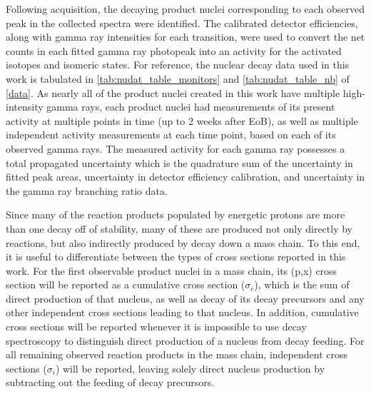 \documentclass[3p]{elsarticle}
\begin{document}
Following  acquisition, the decaying product nuclei corresponding to each observed peak in the collected spectra were identified.
The calibrated detector efficiencies, along with gamma ray intensities for each transition, were used to convert the net  counts in each fitted gamma ray photopeak into an activity for the activated isotopes and isomeric states.
For reference, the nuclear decay data used in this work is tabulated in \autoref{tab:nudat_table_monitors} and \autoref{tab:nudat_table_nb} of \ref{data}.
As nearly all of the product nuclei created in this work have multiple high-intensity gamma rays, each product nuclei had measurements of its present activity at multiple points in time (up to 2 weeks after EoB), as well as multiple independent activity measurements at each time point, based on each of its observed gamma rays.
The measured activity for each gamma ray possesses a total propagated uncertainty which is the quadrature sum of the uncertainty in  fitted peak areas, uncertainty in detector efficiency calibration, and uncertainty in the gamma ray branching ratio data.






Since many of the reaction products populated by energetic protons are more than one decay off of stability, many of these are produced not only  directly by reactions, but also indirectly produced by decay down a mass chain.
To this end, it is useful to differentiate between the types of cross sections reported in this work. 
For the first observable product nuclei in a mass chain, its (p,x) cross section will be reported as a cumulative cross section ($\sigma_c$), which is the sum of direct production of that nucleus, as well as decay of its decay precursors and any other independent cross sections leading to that nucleus. 
In addition, cumulative cross sections will be reported whenever it is impossible to use decay spectroscopy to distinguish direct production of a nucleus from decay feeding.
For all remaining observed reaction products in the mass chain, independent cross sections ($\sigma_i$) will be reported, leaving solely direct nucleus production by subtracting out the feeding of decay precursors.
\end{document}
